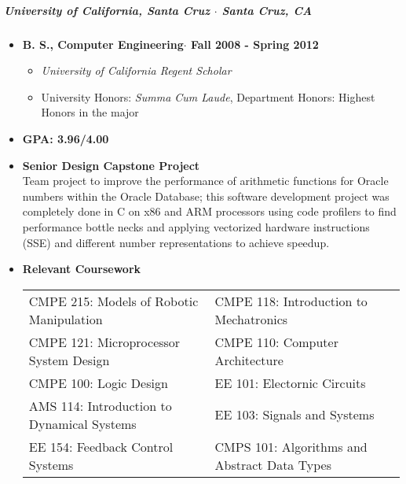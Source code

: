 \documentclass[10pt,letterpaper]{article}
\begin{document}
\subparagraph{University of California, Santa Cruz $\cdot$ Santa Cruz, CA }
\begin{itemize}
\item {\bf B. S., Computer Engineering$\cdot$ Fall 2008 - Spring 2012}
\begin{itemize}
		\item {\em University of California Regent Scholar} 
		\item University Honors: {\em Summa Cum Laude}, Department Honors: Highest Honors in the major

	\end{itemize}
    	\item {\bf GPA: 3.96/4.00 }
        \item {\bf Senior Design Capstone Project}\\
    Team project to improve the performance of arithmetic functions for Oracle numbers within the Oracle Database; this software development project was completely done in C on x86 and ARM processors using code profilers to find performance bottle necks and applying vectorized hardware instructions (SSE) and different number representations to achieve speedup. 
    	\item {\bf Relevant Coursework}\\
    \begin{tabular}{l l}
    CMPE 215: Models of Robotic Manipulation & \hfill CMPE 118: Introduction to Mechatronics \\
    CMPE 121: Microprocessor System Design & \hfill CMPE 110: Computer Architecture \\
    CMPE 100: Logic Design & \hfill EE 101: Electornic Circuits \\
     AMS 114: Introduction to Dynamical Systems & \hfill EE 103: Signals and Systems \\
    EE 154: Feedback Control Systems & \hfill CMPS 101: Algorithms and Abstract Data Types\\
        \end{tabular}
\end{itemize}








\iffalse
\end{document}
